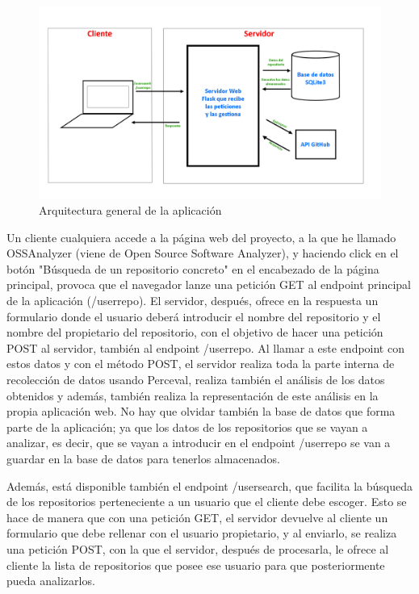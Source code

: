 \documentclass[a4paper, 12pt]{book}
\begin{document}
\begin{figure}[H]
  \centering
  \includegraphics[width=1\textwidth]{img/arquitecturageneralv2.jpg}
  \caption{Arquitectura general de la aplicación}
  \label{figura:arqgeneral}
\end{figure}

Un cliente cualquiera accede a la página web del proyecto, a la que he llamado OSSAnalyzer (viene de Open Source Software Analyzer), y haciendo click en el botón "Búsqueda de un repositorio concreto" en el encabezado de la página principal, provoca que el navegador lanze una petición GET al endpoint principal de la aplicación (/userrepo). El servidor, después, ofrece en la respuesta un formulario donde el usuario deberá introducir el nombre del repositorio y el nombre del propietario del repositorio, con el objetivo de hacer una petición POST al servidor, también al endpoint /userrepo. Al llamar a este endpoint con estos datos y con el método POST, el servidor realiza toda la parte interna de recolección de datos usando Perceval, realiza también el análisis de los datos obtenidos y además, también realiza la representación de este análisis en la propia aplicación web. No hay que olvidar también la base de datos que forma parte de la aplicación; ya que los datos de los repositorios que se vayan a analizar, es decir, que se vayan a introducir en el endpoint /userrepo se van a guardar en la base de datos para tenerlos almacenados.

Además, está disponible también el endpoint /usersearch, que facilita la búsqueda de los repositorios perteneciente a un usuario que el cliente debe escoger. Esto se hace de manera que con una petición GET, el servidor devuelve al cliente un formulario que debe rellenar con el usuario propietario, y al enviarlo, se realiza una petición POST, con la que el servidor, después de procesarla, le ofrece al cliente la lista de repositorios que posee ese usuario para que posteriormente pueda analizarlos.
\end{document}
